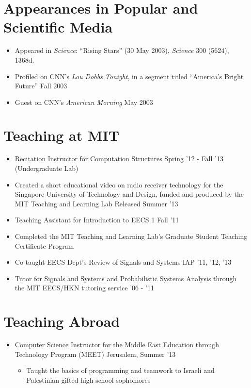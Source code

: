 \documentclass[margin]{res}
\begin{document}
\begin{resume}


\section{Appearances in Popular and Scientific Media}
\begin{itemize}
\item Appeared in \textit{Science}: ``Rising Stars'' (30 May 2003), \textit{Science} 300 (5624), 1368d.
\item Profiled on CNN's \textit{Lou Dobbs Tonight}, in a segment titled ``America's Bright Future''  \hfill Fall 2003 
\item Guest on CNN's \textit{American Morning} \hfill May 2003
\end{itemize}
 
\section{Teaching at MIT}
\begin{itemize}
\item Recitation Instructor for Computation Structures \hfill Spring '12 - Fall '13 \\(Undergraduate Lab)
\item Created a short educational video on radio receiver technology for the Singapore University of Technology and Design, funded and produced by the MIT Teaching and Learning Lab \hfill Released Summer '13
\item Teaching Assistant for Introduction to EECS 1 \hfill Fall '11

\item Completed the MIT Teaching and Learning Lab's Graduate Student Teaching Certificate Program
\item Co-taught EECS Dept's Review of Signals and Systems \hfill IAP '11, '12, '13
\item Tutor for Signals and Systems and Probabilistic Systems Analysis through the MIT EECS/HKN tutoring service \hfill '06 - '11
\end{itemize}

\section{Teaching Abroad}
\begin{itemize}
\item Computer Science Instructor for the Middle East Education through Technology Program (MEET) \hfill Jerusalem, Summer '13 
\begin{itemize}
\item Taught the basics of programming and teamwork to Israeli and Palestinian gifted high school sophomores
\end{itemize}
\end{itemize}


\end{resume}
\end{document}

